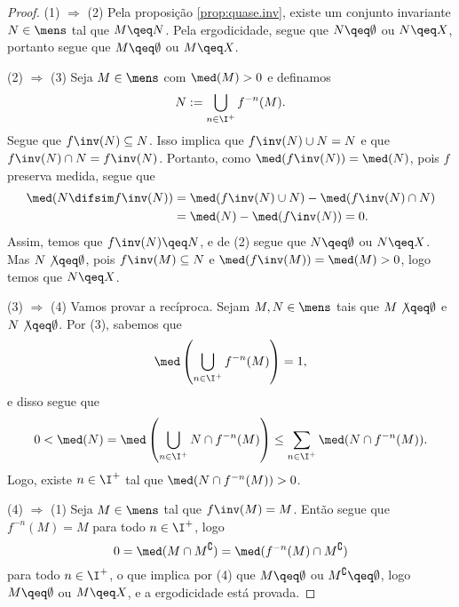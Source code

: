 \begin{proof}
(1) $\Rightarrow$ (2) Pela proposição \ref{prop:quase.inv}, existe um conjunto invariante $N \in \mens$ tal que $M \qeq N$. Pela ergodicidade, segue que $N \qeq \emptyset$ ou $N \qeq X$, portanto segue que $M \qeq \emptyset$ ou $M \qeq X$.

(2) $\Rightarrow$ (3) Seja $M \in \mens$ com $\med(M)>0$ e definamos
	\begin{equation*}
	N := \bigcup_{n \in \I^+} f^{-n}(M).
	\end{equation*}
Segue que $f\inv(N) \subseteq N$. Isso implica que $f\inv(N) \cup N= N$ e que $f\inv(N) \cap N = f\inv(N)$. Portanto, como $\med(f\inv(N))=\med(N)$, pois $f$ preserva medida, segue que
	\begin{align*}
	\med(N \difsim f\inv(N)) &= \med(f\inv(N) \cup N) - \med(f\inv(N) \cap N) \\
		&= \med(N) - \med(f\inv(N)) = 0.
	\end{align*}
Assim, temos que $f\inv(N) \qeq N$, e de (2) segue que $N \qeq \emptyset$ ou $N \qeq X$. Mas $N \not\qeq \emptyset$, pois $f\inv(M) \subseteq N$ e $\med(f\inv(M))=\med(M) > 0$, logo temos que $N \qeq X$.

(3) $\Rightarrow$ (4) Vamos provar a recíproca. Sejam $M,N \in \mens$ tais que $M \not\qeq \emptyset$ e $N \not\qeq \emptyset$. Por (3), sabemos que
	\begin{equation*}
	\med\left(\bigcup_{n \in \I^+} f^{-n}(M)\right)=1,
	\end{equation*}
e disso segue que
	\begin{equation*}
	0 < \med(N) = \med\left(\bigcup_{n \in \I^+} N \cap f^{-n}(M)\right) \leq \sum_{n \in \I^+} \med(N \cap f^{-n}(M)).
	\end{equation*}
Logo, existe $n \in \I^+$ tal que $\med(N \cap f^{-n}(M))>0$.

(4) $\Rightarrow$ (1) Seja $M \in \mens$ tal que $f\inv(M)=M$. Então segue que $f^{-n}(M)=M$ para todo $n \in \I^+$, logo
	\begin{equation*}
	0=\med(M \cap M^\complement)=\med(f^{-n}(M) \cap M^\complement)
	\end{equation*}
para todo $n \in \I^+$, o que implica por (4) que $M \qeq \emptyset$ ou $M^\complement \qeq \emptyset$, logo $M \qeq \emptyset$ ou $M \qeq X$, e a ergodicidade está provada.
\end{proof}

